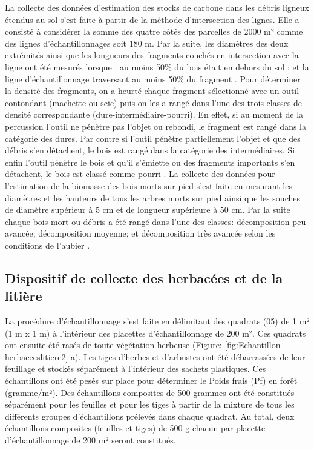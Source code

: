\documentclass[
  12pt,
  a4paper,
  extrafontsizes,
  onecolumn,
  openright]{book}
\theoremstyle{definition}
\theoremstyle{definition}
\theoremstyle{definition}
\theoremstyle{definition}
\theoremstyle{remark}
\begin{document}
La collecte des données d'estimation des stocks de carbone dans les débris ligneux étendus au sol s'est faite à partir de la méthode d'intersection des lignes. Elle a consisté à considérer la somme des quatre côtés des parcelles de 2000 m² comme des lignes d'échantillonnages soit 180 m. Par la suite, les diamètres des deux extrémités ainsi que les longueurs des fragments couchés en intersection avec la ligne ont été mesurés lorsque : au moins 50\% du bois était en dehors du sol ; et la ligne d'échantillonnage traversant au moins 50\% du fragment \citep{Kabelong2018, Walker2012}. Pour déterminer la densité des fragments, on a heurté chaque fragment sélectionné avec un outil contondant (machette ou scie) puis on les a rangé dans l'une des trois classes de densité correspondante (dure-intermédiaire-pourri). En effet, si au moment de la percussion l'outil ne pénètre pas l'objet ou rebondi, le fragment est rangé dans la catégorie des dures. Par contre si l'outil pénètre partiellement l'objet et que des débris s'en détachent, le bois est rangé dans la catégorie des intermédiaires. Si enfin l'outil pénètre le bois et qu'il s'émiette ou des fragments importants s'en détachent, le bois est classé comme pourri \citep{Pearson2005}. La collecte des données pour l'estimation de la biomasse des bois morts sur pied s'est faite en mesurant les diamètres et les hauteurs de tous les arbres morts sur pied ainsi que les souches de diamètre supérieur à 5 cm et de longueur supérieure à 50 cm. Par la suite chaque bois mort ou débris a été rangé dans l'une des classes: décomposition peu avancée; décomposition moyenne; et décomposition très avancée selon les conditions de l'aubier \citep{Walker2012}.

\hypertarget{dispositif-de-collecte-des-herbacuxe9es-et-de-la-litiuxe8re}{%
\subsection{Dispositif de collecte des herbacées et de la litière}\label{dispositif-de-collecte-des-herbacuxe9es-et-de-la-litiuxe8re}}

La procédure d'échantillonnage s'est faite en délimitant des quadrats (05) de 1 m² (1 m x 1 m) à l'intérieur des placettes d'échantillonnage de 200 m². Ces quadrats ont ensuite été rasés de toute végétation herbeuse (Figure: \ref{fig:Echantillon-herbaceeslitiere2} a). Les tiges d'herbes et d'arbustes ont été débarrassées de leur feuillage et stockés séparément à l'intérieur des sachets plastiques. Ces échantillons ont été pesés sur place pour déterminer le Poids frais (Pf) en forêt (gramme/m²). Des échantillons composites de 500 grammes ont été constitués séparément pour les feuilles et pour les tiges à partir de la mixture de tous les différents groupes d'échantillons prélevés dans chaque quadrat. Au total, deux échantillons composites (feuilles et tiges) de 500 g chacun par placette d'échantillonnage de 200 m² seront constitués.
\end{document}
